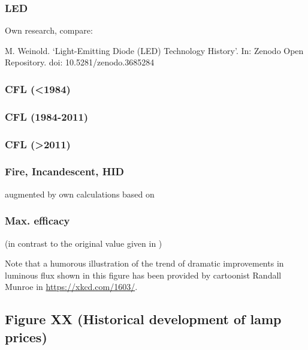 \documentclass[10pt]{article}
\begin{document}
\subsubsection{LED}

Own research, compare:

M. Weinold. ‘Light-Emitting Diode (LED) Technology History’.
In: Zenodo Open Repository. doi: 10.5281/zenodo.3685284 

\subsubsection{CFL (<1984)}

\cite{Bouwknegt1982}\cite{Vrenken1983}

\subsubsection{CFL (1984-2011)}

\cite{eger2018origin}

\subsubsection{CFL (>2011)}

\cite{Guan2015}

\subsubsection{Fire, Incandescent, HID}

\cite{azevedo2009transition} augmented by own calculations based on \cite{benesch1905beleuchtungswesen}

\subsubsection{Max. efficacy}

\cite{Murphy2012} (in contrast to the original value given in \cite{azevedo2009transition})

Note that a humorous illustration of the trend of dramatic improvements in luminous flux shown in this figure has been provided by cartoonist Randall Munroe in \href{https://xkcd.com/1603/}{https://xkcd.com/1603/}.

\subsection{Figure XX (Historical development of lamp prices)}
\end{document}
